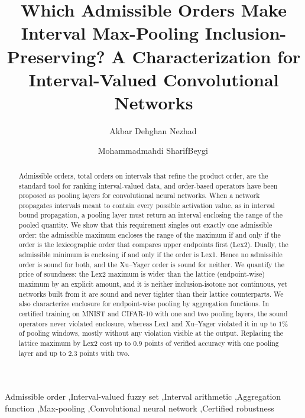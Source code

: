\documentclass[preprint,12pt]{elsarticle}
\theoremstyle{definition}
\begin{document}
\begin{frontmatter}

\title{Which Admissible Orders Make Interval Max-Pooling Inclusion-Preserving? A Characterization for Interval-Valued Convolutional Networks}

\author[1]{Akbar Dehghan Nezhad\,}

\author[1]{Mohammadmahdi SharifBeygi\,}



\begin{abstract}
Admissible orders, total orders on intervals that refine the product order, are the standard tool for ranking interval-valued data, and order-based operators have been proposed as pooling layers for convolutional neural networks. When a network propagates intervals meant to contain every possible activation value, as in interval bound propagation, a pooling layer must return an interval enclosing the range of the pooled quantity. We show that this requirement singles out exactly one admissible order: the admissible maximum encloses the range of the maximum if and only if the order is the lexicographic order that compares upper endpoints first (Lex2). Dually, the admissible minimum is enclosing if and only if the order is Lex1. Hence no admissible order is sound for both, and the Xu--Yager order is sound for neither. We quantify the price of soundness: the Lex2 maximum is wider than the lattice (endpoint-wise) maximum by an explicit amount, and it is neither inclusion-isotone nor continuous, yet networks built from it are sound and never tighter than their lattice counterparts. We also characterize enclosure for endpoint-wise pooling by aggregation functions. In certified training on MNIST and CIFAR-10 with one and two pooling layers, the sound operators never violated enclosure, whereas Lex1 and Xu--Yager violated it in up to $1\%$ of pooling windows, mostly without any violation visible at the output. Replacing the lattice maximum by Lex2 cost up to $0.9$ points of verified accuracy with one pooling layer and up to $2.3$ points with two.
\end{abstract}

\begin{keyword}
Admissible order \sep Interval-valued fuzzy set \sep Interval arithmetic \sep Aggregation function \sep Max-pooling \sep Convolutional neural network \sep Certified robustness
\end{keyword}

\end{frontmatter}
\end{document}
